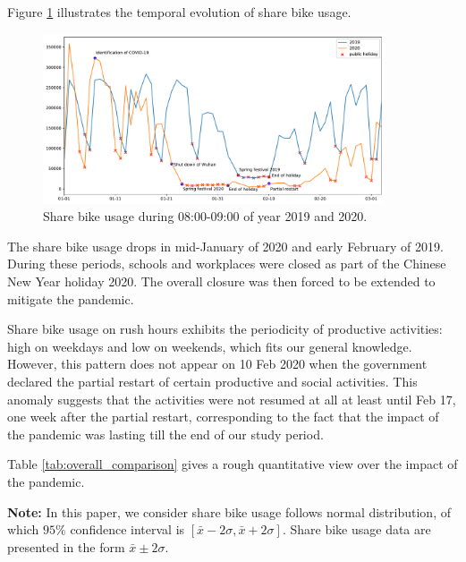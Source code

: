 \documentclass[ijgi,submit,moreauthors,pdftex]{Definitions/mdpi}
\begin{document}
Figure \ref{fig:hour_comparison_8} %
 illustrates the temporal evolution of share bike usage.

\begin{figure}[ht]
    \centering
    \includegraphics[width=0.9\textwidth]{Figures/hour_8-eps-converted-to.pdf}
    \caption{Share bike usage during 08:00-09:00 of year 2019 and 2020.}
    \label{fig:hour_comparison_8}
\end{figure}

The share bike usage drops in mid-January of 2020 and early February of 2019.
During these periods, schools and workplaces were closed as part of the Chinese New Year holiday 2020.
The overall closure was then forced to be extended to mitigate the pandemic.

Share bike usage on rush hours exhibits the periodicity of productive activities: high on weekdays and low on weekends, which fits our general knowledge.
However, this pattern does not appear on 10 Feb 2020 when the government declared the partial restart of certain productive and social activities.
This anomaly suggests that the activities were not resumed at all at least until Feb 17, one week after the partial restart, corresponding to the fact that the impact of the pandemic was lasting till the end of our study period.

Table \ref{tab:overall_comparison} gives a rough quantitative view over the impact of the pandemic.

\textbf{Note:} In this paper, we consider share bike usage follows normal distribution, of which $95\%$ confidence interval is $[\bar{x}-2\sigma,\bar{x}+2\sigma]$.
Share bike usage data are presented in the form $\bar{x}\pm2\sigma$.
\end{document}
